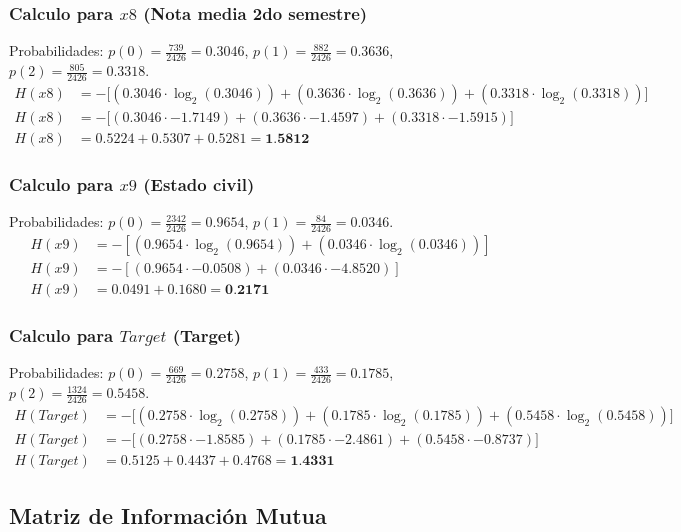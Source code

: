 \documentclass[12pt,a4paper]{article}
\begin{document}
\subsubsection{Calculo para $x8$ (Nota media 2do semestre)}
Probabilidades: $p(0) = \frac{739}{2426} = 0.3046$, $p(1) = \frac{882}{2426} = 0.3636$, $p(2) = \frac{805}{2426} = 0.3318$.
\begin{align*}
    H(x8) &= -\big[ (0.3046 \cdot \log_2(0.3046)) + (0.3636 \cdot \log_2(0.3636)) + (0.3318 \cdot \log_2(0.3318)) \big] \\
    H(x8) &= -\big[ (0.3046 \cdot -1.7149) + (0.3636 \cdot -1.4597) + (0.3318 \cdot -1.5915) \big] \\
    H(x8) &= 0.5224 + 0.5307 + 0.5281 = \textbf{1.5812}
\end{align*}

\subsubsection{Calculo para $x9$ (Estado civil)}
Probabilidades: $p(0) = \frac{2342}{2426} = 0.9654$, $p(1) = \frac{84}{2426} = 0.0346$.
\begin{align*}
    H(x9) &= -\left[ (0.9654 \cdot \log_2(0.9654)) + (0.0346 \cdot \log_2(0.0346)) \right] \\
    H(x9) &= -\left[ (0.9654 \cdot -0.0508) + (0.0346 \cdot -4.8520) \right] \\
    H(x9) &= 0.0491 + 0.1680 = \textbf{0.2171}
\end{align*}

\subsubsection{Calculo para $Target$ (Target)}
Probabilidades: $p(0) = \frac{669}{2426} = 0.2758$, $p(1) = \frac{433}{2426} = 0.1785$, $p(2) = \frac{1324}{2426} = 0.5458$.
\begin{align*}
    H(Target) &= -\big[ (0.2758 \cdot \log_2(0.2758)) + (0.1785 \cdot \log_2(0.1785)) + (0.5458 \cdot \log_2(0.5458)) \big] \\
    H(Target) &= -\big[ (0.2758 \cdot -1.8585) + (0.1785 \cdot -2.4861) + (0.5458 \cdot -0.8737) \big] \\
    H(Target) &= 0.5125 + 0.4437 + 0.4768 = \textbf{1.4331}
\end{align*}

\subsection{Matriz de Información Mutua}
\end{document}
